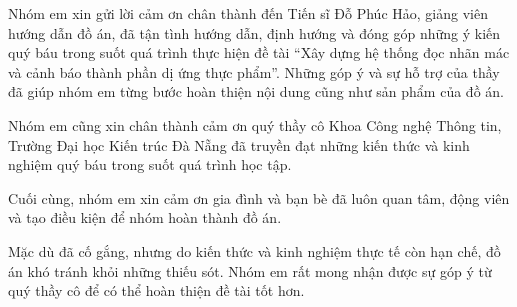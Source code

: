 
\begin{acknowledgments}
	
	Nhóm em xin gửi lời cảm ơn chân thành đến Tiến sĩ Đỗ Phúc Hảo,
	giảng viên hướng dẫn đồ án, đã tận tình hướng dẫn, định hướng
	và đóng góp những ý kiến quý báu trong suốt quá trình thực hiện
	đề tài ``Xây dựng hệ thống đọc nhãn mác và cảnh báo thành phần
	dị ứng thực phẩm''. Những góp ý và sự hỗ trợ của thầy đã giúp
	nhóm em từng bước hoàn thiện nội dung cũng như sản phẩm của đồ án.
	
	Nhóm em cũng xin chân thành cảm ơn quý thầy cô Khoa Công nghệ
	Thông tin, Trường Đại học Kiến trúc Đà Nẵng đã truyền đạt những
	kiến thức và kinh nghiệm quý báu trong suốt quá trình học tập.
	
	Cuối cùng, nhóm em xin cảm ơn gia đình và bạn bè đã luôn quan tâm,
	động viên và tạo điều kiện để nhóm hoàn thành đồ án.
	
	Mặc dù đã cố gắng, nhưng do kiến thức và kinh nghiệm thực tế còn
	hạn chế, đồ án khó tránh khỏi những thiếu sót. Nhóm em rất mong
	nhận được sự góp ý từ quý thầy cô để có thể hoàn thiện đề tài tốt hơn.
	
	\vspace{1.4em}
	\hfill{}
	
\end{acknowledgments}
